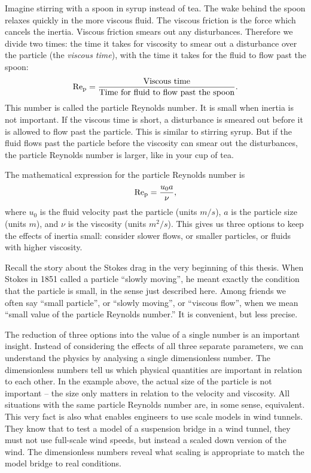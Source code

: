 \documentclass[thesis.tex]{subfiles}
\begin{document}
Imagine stirring with a spoon in syrup instead of tea. The wake behind the spoon relaxes quickly in the more viscous fluid. The viscous friction is the force which cancels the inertia. Viscous friction smears out any disturbances. Therefore we divide two times: the time it takes for viscosity to smear out a disturbance over the particle (the \emph{viscous time}), with the time it takes for the fluid to flow past the spoon:
\begin{align*}
\mbox{Re}_{\mathrm p} = \frac{\textrm{Viscous time}}{\textrm{Time for fluid to flow past the spoon}}.
\end{align*} 
This number is called the particle Reynolds number. It is small when inertia is not important.
If the viscous time is short, a disturbance is smeared out before it is allowed to flow past the particle. This is similar to stirring syrup. But if the fluid flows past the particle before the viscosity can smear out the disturbances, the particle Reynolds number is larger, like in your cup of tea.

The mathematical expression for the particle Reynolds number is 
\begin{align*}
	\mbox{Re}_{\mathrm p} = \frac{u_0 a}{\nu},
\end{align*}
where $u_0$ is the fluid velocity past the particle (units $\unit{m/s}$), $a$ is the particle size (units $\unit{m}$), and $\nu$ is the viscosity (units $\unit{m^2/s}$). This gives us three options to keep the effects of inertia small: consider slower flows, or smaller particles, or fluids with higher viscosity.  

Recall the story about the Stokes drag in the very beginning of this thesis. When Stokes in 1851 called a particle ``slowly moving'', he meant exactly the condition that the particle is small, in the sense just described here. Among friends we often say ``small particle'', or ``slowly moving'', or ``viscous flow'', when we mean ``small value of the particle Reynolds number.'' It is convenient, but less precise.

The reduction of three options into the value of a single number is an important insight. Instead of considering the effects of all three separate parameters, we can understand the physics by analysing a single dimensionless number. The dimensionless numbers tell us which physical quantities are important in relation to each other. In the example above, the actual size of the particle is not important -- the size only matters in relation to the velocity and viscosity. All situations with the same particle Reynolds number are, in some sense, equivalent. This very fact is also what enables engineers to use scale models in wind tunnels. They know that to test a model of a suspension bridge in a wind tunnel, they must not use full-scale wind speeds, but instead a scaled down version of the wind. The dimensionless numbers reveal what scaling is appropriate to match the model bridge to real conditions.
\end{document}
